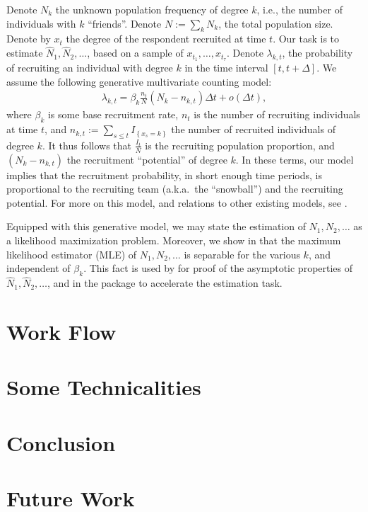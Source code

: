 \documentclass[article]{jss}
\newcommand{\set}[1]{\left\{ #1 \right\}}
\newcommand{\smallO}{o}
\newcommand{\aka}{{a.k.a.\ }}
\newcommand{\Ns}{N_1,N_2,\dots}
\newcommand{\hatNs}{\hat{N}_1, \hat{N}_2,\dots}
\begin{document}
Denote $N_k$ the unknown population frequency of degree $k$, i.e., the number of individuals with $k$ ``friends''. 
Denote $N:=\sum_k N_k$, the total population size. 
Denote by $x_t$ the degree of the respondent recruited at time $t$. 
Our task is to estimate $\hat{N}_1, \hat{N}_2,\dots$, based on a sample of $x_{t_1},\dots, x_{t_\tau}$. 
Denote $\lambda_{k,t}$, the probability of recruiting an individual with degree $k$ in the time interval $[t,t+\Delta]$.
We assume the following generative multivariate counting model:
\begin{align}
 \lambda_{k,t} =  \beta_k \frac{n_t}{N}  (N_k - n_{k,t}) \Delta t + \smallO(\Delta t),
\end{align}
where $\beta_k$ is some base recruitment rate, 
$n_t$ is the number of recruiting individuals at time $t$, 
and $n_{k,t}:=\sum_{s\leq t} I_{\set{x_s=k}}$ the number of recruited individuals of degree $k$. 
It thus follows that $\frac{I_t}{N}$ is the recruiting population proportion, and $(N_k - n_{k,t})$ the recruitment ``potential'' of degree $k$.
In these terms, our model implies that the recruitment probability, in short enough time periods, is proportional to the recruiting team (\aka the ``snowball'') and the recruiting potential. 
For more on this model, and relations to other existing models, see \citet{berchenko_modeling_2013}.

Equipped with this generative model, we may state the estimation of $\Ns$ as a likelihood maximization problem. 
Moreover, we show in \cite{berchenko_modeling_2013} that the maximum likelihood estimator (MLE) of $\Ns$ is separable for the various $k$, and independent of $\beta_k$. 
This fact is used by \citet{berchenko_modeling_2013} for proof of the asymptotic properties of $\hatNs$, and in the   package to accelerate the estimation task.





\section{Work Flow}


\section{Some Technicalities}


\section{Conclusion}


\section{Future Work}




\end{document}
